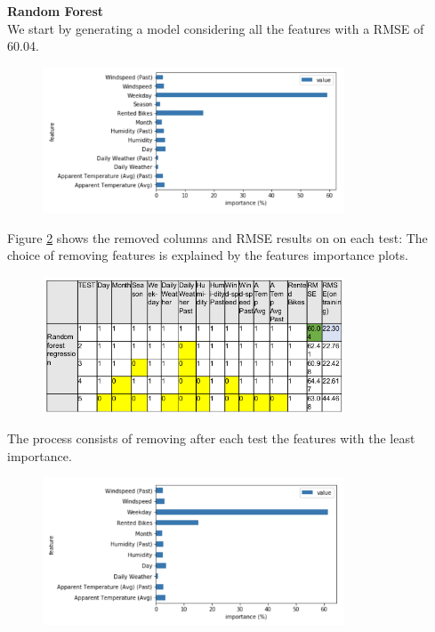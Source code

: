 \textbf{Random Forest}\\
We start by generating a model considering all the features with a RMSE of 60.04.
\begin{figure}[H]
\centering
\includegraphics[width=0.8\textwidth]{media/test1_rd}\label{fig:test1_rd}
\label{fig:test1_rd}
\end{figure}
Figure \ref{fig:anasst2} shows the removed columns and RMSE results on on each test:
The choice of removing features is explained by the features importance plots.
\begin{figure}[H]
\centering
\includegraphics[width=0.8\textwidth]{media/anasst2}\label{fig:anasst2}
\label{fig:anasst2}
\end{figure}
The process consists of removing after each test the features with the least importance.
\begin{figure}[H]
\centering
\includegraphics[width=0.8\textwidth]{media/test2_rd}\label{fig:test2_rd}
\label{fig:test2_rd}
\end{figure}
